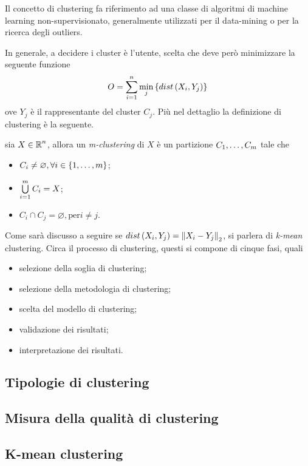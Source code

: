 \documentclass{subfiles}
\begin{document}
Il concetto di clustering fa riferimento ad una classe di algoritmi di machine learning non-supervisionato,
generalmente utilizzati per il data-mining o per la ricerca degli outliers\footnotemark[1].

In generale, a decidere i cluster è l'utente, scelta che deve però minimizzare la seguente funzione
$$
    O = \Sum{\Min*{dist\left(X_{i}, Y_{j}\right)}[j]}{i = 1}[n]
$$
ove $Y_{j}$ è il rappresentante del cluster $C_{j}$.
Più nel dettaglio la definizione di clustering è la seguente.
\begin{Definition*}
    sia $X \in \operatorname{\mathbb{R}}^{n}$, allora un \emph{m-clustering} di $X$ è un partizione ${C}_{1}, \ldots, {C}_{m}$ tale che
    \begin{itemize}
        \item $C_{i} \neq \varnothing, \forall i \in \Set{1, \dots, m}$;
        \item $\Bigcup{C_{i}}{i = 1}[m] = X$;
        \item $C_{i} \cap C_{j} = \varnothing, \text{per} i \neq j$.
    \end{itemize}
\end{Definition*}
Come sarà discusso a seguire se $dist\left(X_{i}, Y_{j}\right) = \Norm{X_{i} - Y_{j}}[2]$, si parlera di \emph{k-mean} clustering.
Circa il processo di clustering, questi si compone di cinque fasi, quali
\begin{itemize}
    \item selezione della soglia di clustering;
    \item selezione della metodologia di clustering;
    \item scelta del modello di clustering;
    \item validazione dei risultati;
    \item interpretazione dei risultati.
\end{itemize}

\subsection{Tipologie di clustering}


\subsection{Misura della qualità di clustering}


\subsection{K-mean clustering}


\end{document}
